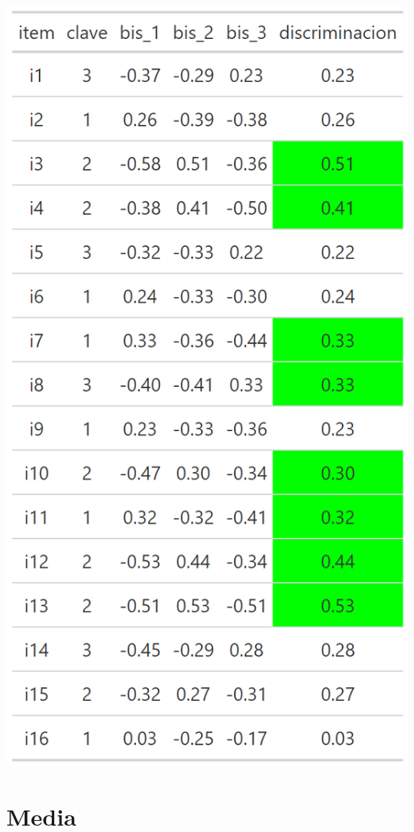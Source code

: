 \documentclass[
  letterpaper,
  DIV=11,
  numbers=noendperiod]{scrreprt}
\begin{document}
\begin{center}
\includegraphics[width=0.6\linewidth,height=\textheight,keepaspectratio]{images/teoria_clasica_disc_buena.png}
\end{center}

\section{Media}
\end{document}
